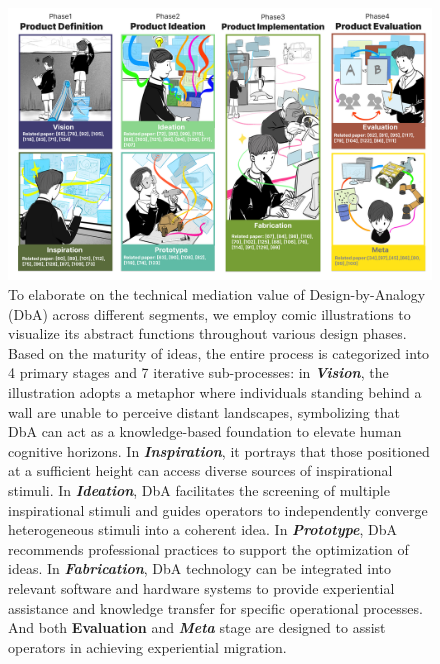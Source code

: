 \begin{figure}
    \centering
    \includegraphics[width=1\linewidth]{Figures/CreateProcess.png}
    \caption{To elaborate on the technical mediation value\cite{smits2019values} of Design-by-Analogy (DbA) across different segments, we employ comic illustrations to visualize its abstract functions throughout various design phases. Based on the maturity of ideas, the entire process is categorized into 4 primary stages and 7 iterative sub-processes: in \textbf{\textit{Vision}}, the illustration adopts a metaphor where individuals standing behind a wall are unable to perceive distant landscapes, symbolizing that DbA can act as a knowledge-based foundation to elevate human cognitive horizons. In \textbf{\textit{Inspiration}}, it portrays that those positioned at a sufficient height can access diverse sources of inspirational stimuli. In \textbf{\textit{Ideation}}, DbA facilitates the screening of multiple inspirational stimuli and guides operators to independently converge heterogeneous stimuli into a coherent idea. In \textit{\textbf{Prototype}}, DbA recommends professional practices to support the optimization of ideas. In \textit{\textbf{Fabrication}}, DbA technology can be integrated into relevant software and hardware systems to provide experiential assistance and knowledge transfer for specific operational processes. And both \textbf{Evaluation} and \textbf{\textit{Meta}} stage are designed to assist operators in achieving experiential migration.}
    \label{fig:Create Process}
\end{figure}





